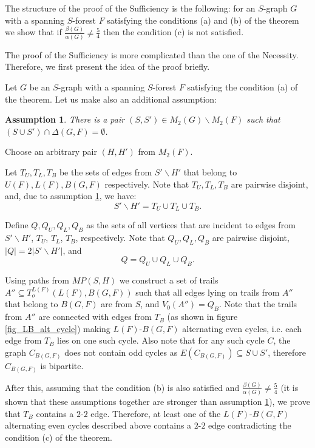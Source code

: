 \documentclass[a4paper, 12pt]{article}
\newtheorem{assumption}{Assumption}
\begin{document}
The structure of the proof of the Sufficiency is the following: for
an $S$-graph $G$ with a spanning $S$-forest $F$ satisfying the
conditions (a) and (b) of the theorem we show that if
$\frac{\beta(G)}{\alpha(G)} \neq \frac{5}{4}$ then the condition (c)
is not satisfied.

The proof of the Sufficiency is more complicated than the one of the
Necessity. Therefore, we first present the idea of the proof
briefly.

Let $G$ be an $S$-graph with a spanning $S$-forest $F$ satisfying
the condition (a) of the theorem. Let us make also an additional
assumption:

\begin{assumption}\label{assumption_no_delta}
There is a pair $(S, S') \in M_2(G) \backslash M_2(F)$ such that $(S
\cup S') \cap \Delta(G, F) = \emptyset$.
\end{assumption}

Choose an arbitrary pair $(H, H')$ from $M_2(F)$.

Let $T_U, T_L, T_B$ be the sets of edges from $S' \backslash H'$
that belong to $U(F), L(F), B(G,F)$ respectively. Note that $T_U,
T_L, T_B$ are pairwise disjoint, and, due to assumption
\ref{assumption_no_delta}, we have:
$$S' \backslash H' = T_U \cup T_L \cup T_B.$$

Define $Q, Q_U, Q_L, Q_B$ as the sets of all vertices that are
incident to edges from $S' \backslash H'$, $T_U$, $T_L$, $ T_B$,
respectively. Note that $Q_U, Q_L, Q_B$ are pairwise disjoint, $|Q|
= 2|S' \backslash H'|$, and
$$Q = Q_U \cup Q_L \cup Q_B.$$

Using paths from $MP(S, H)$ we construct a set of trails $A''
\subseteq T_o^{L(F)}(L(F), B(G,F))$ such that all edges lying on
trails from $A''$ that belong to $B(G, F)$ are from $S$, and
$V_0(A'') = Q_B$. Note that the trails from $A''$ are connected with
edges from $T_B$ (as shown in figure \ref{fig_LB_alt_cycle}) making
$L(F)$-$B(G,F)$ alternating even cycles, i.e. each edge from $T_B$
lies on one such cycle. Also note that for any such cycle $C$, the
graph $C_{B(G,F)}$ does not contain odd cycles as $E(C_{B(G,F)})
\subseteq S \cup S'$, therefore $C_{B(G,F)}$ is bipartite.

After this, assuming that the condition (b) is also satisfied and
$\frac{\beta(G)}{\alpha(G)} \neq \frac{5}{4}$ (it is shown that
these assumptions together are stronger than assumption
\ref{assumption_no_delta}), we prove that $T_B$ contains a $2$-$2$
edge. Therefore, at least one of the $L(F)$-$B(G,F)$ alternating
even cycles described above contains a $2$-$2$ edge contradicting
the condition (c) of the theorem.
\end{document}

